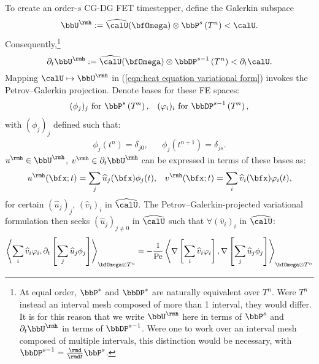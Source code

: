 \begin{example}
      To create an order-$s$ CG-DG FET timestepper, define the Galerkin subspace
      \begin{equation}
          \bbU^{\rmh}  :=  \widehat{\calU}(\bfOmega)\otimes\bbP^{s}\left(T^{n}\right)  <  \calU.
      \end{equation}
      Consequently,\footnote{At equal order, $\bbP^{*}$ and $\bbDP^{*}$ are naturally equivalent over $T^{n}$. Were $T^{n}$ instead an interval mesh composed of more than 1 interval, they would differ. It is for this reason that we write $\bbU^{\rmh}$ here in terms of $\bbP^{s}$ and $\partial_{t}\bbU^{\rmh}$ in terms of $\bbDP^{s - 1}$. Were one to work over an interval mesh composed of multiple intervals, this distinction would be necessary, with $\bbDP^{s - 1}  =  \frac{\rmd}{\rmd t}\bbP^{s}$.}
      \begin{equation}
          \partial_{t}\bbU^{\rmh}  :=  \widehat{\calU}(\bfOmega)\otimes\bbDP^{s - 1}\left(T^{n}\right)  <  \partial_{t}\calU.
      \end{equation}
      Mapping $\calU  \mapsto  \bbU^{\rmh}$ in (\ref{eqn:heat equation variational form}) invokes the Petrov--Galerkin projection. Denote bases for these FE spaces:
      \begin{align}
          (\phi_{j})_{j}     \text{ for }  \bbP^{s}\left(T^{n}\right),         &&
          (\varphi_{i})_{i}  \text{ for }  \bbDP^{s - 1}\left(T^{n}\right),
      \end{align}
      with $(\phi_{j})_{j}$ defined such that:
      \begin{align}
          \phi_{j}\left(t^{n}\right)      =  \delta_{j0},  &&
          \phi_{j}\left(t^{n + 1}\right)  =  \delta_{js}.
      \end{align}
      $u^{\rmh}  \in  \bbU^{\rmh}$, $v^{\rmh}  \in  \partial_{t}\bbU^{\rmh}$ can be expressed in terms of these bases as:
      \begin{align}
          u^{\rmh}(\bfx; t)  =  \sum_{j}\widehat{u}_{j}(\bfx)\phi_{j}(t),  &&
          v^{\rmh}(\bfx; t)  =  \sum_{i}\widehat{v}_{i}(\bfx)\varphi_{i}(t),
      \end{align}
      for certain $\left(\widehat{u}_{j}\right)_{j}$, $\left(\widehat{v}_{i}\right)_{i}$ in $\widehat{\calU}$. The Petrov--Galerkin-projected variational formulation then seeks $\left(\widehat{u}_{j}\right)_{j \neq 0}$ in $\widehat{\calU}$ such that $\forall  \left(\widehat{v}_{i}\right)_{i}$ in $\widehat{\calU}$:
      \begin{align}
          \left\langle\sum_{i}\widehat{v}_{i}\varphi_{i}, \partial_{t}\left[\sum_{j}\widehat{u}_{j}\phi_{j}\right]\right\rangle_{\bfOmega\otimes T^{n}}  &=  - \frac{1}{\rmPe}\left\langle\nabla\left[\sum_{i}\widehat{v}_{i}\varphi_{i}\right], \nabla\left[\sum_{j}\widehat{u}_{j}\phi_{j}\right]\right\rangle_{\bfOmega\otimes T^{n}}  \\

\end{align}
\end{example}
